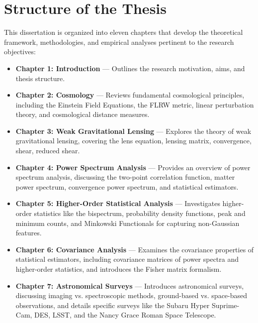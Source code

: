 \section{Structure of the Thesis}

This dissertation is organized into eleven chapters that develop the theoretical framework, methodologies, and empirical analyses pertinent to the research objectives:

\begin{itemize}
    \item \textbf{Chapter 1: Introduction} --- Outlines the research motivation, aims, and thesis structure.
    
    \item \textbf{Chapter 2: Cosmology} --- Reviews fundamental cosmological principles, including the Einstein Field Equations, the FLRW metric, linear perturbation theory, and cosmological distance measures.
    
    \item \textbf{Chapter 3: Weak Gravitational Lensing} --- Explores the theory of weak gravitational lensing, covering the lens equation, lensing matrix, convergence, shear, reduced shear.
    
    \item \textbf{Chapter 4: Power Spectrum Analysis} --- Provides an overview of power spectrum analysis, discussing the two-point correlation function, matter power spectrum, convergence power spectrum, and statistical estimators.
    
    \item \textbf{Chapter 5: Higher-Order Statistical Analysis} --- Investigates higher-order statistics like the bispectrum, probability density functions, peak and minimum counts, and Minkowski Functionals for capturing non-Gaussian features.
    
    \item \textbf{Chapter 6: Covariance Analysis} --- Examines the covariance properties of statistical estimators, including covariance matrices of power spectra and higher-order statistics, and introduces the Fisher matrix formalism.
    
    \item \textbf{Chapter 7: Astronomical Surveys} --- Introduces astronomical surveys, discussing imaging vs. spectroscopic methods, ground-based vs. space-based observations, and details specific surveys like the Subaru Hyper Suprime-Cam, DES, LSST, and the Nancy Grace Roman Space Telescope.
    

\end{itemize}
